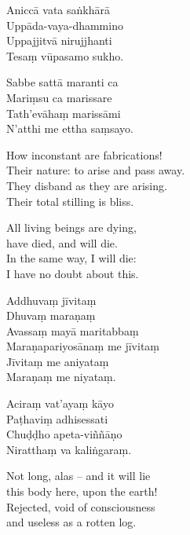 


Aniccā vata saṅkhārā\\
Uppāda-vaya-dhammino\\
Uppajjitvā nirujjhanti\\
Tesaṃ vūpasamo sukho.

Sabbe sattā maranti ca\\
Mariṃsu ca marissare\\
Tath'evāhaṃ marissāmi\\
N'atthi me ettha saṃsayo.

\begin{english}
  How inconstant are fabrications!\\
  Their nature: to arise and pass away.\\
  They disband as they are arising.\\
  Their total stilling is bliss.

  All living beings are dying,\\
  have died, and will die.\\
  In the same way, I will die:\\
  I have no doubt about this. 
\end{english}


Addhuvaṃ jīvitaṃ\\
Dhuvaṃ maraṇaṃ\\
Avassaṃ mayā maritabbaṃ\\
Maraṇapariyosānaṃ me jīvitaṃ\\
Jīvitaṃ me aniyataṃ\\
Maraṇaṃ me niyataṃ. 



Aciraṃ vat'ayaṃ kāyo\\
Paṭhaviṃ adhisessati\\
Chuḍḍho apeta-viññāṇo\\
Niratthaṃ va kaliṅgaraṃ.

\begin{english}
  Not long, alas -- and it will lie\\
  this body here, upon the earth!\\
  Rejected, void of consciousness\\
  and useless as a rotten log. 
\end{english}


